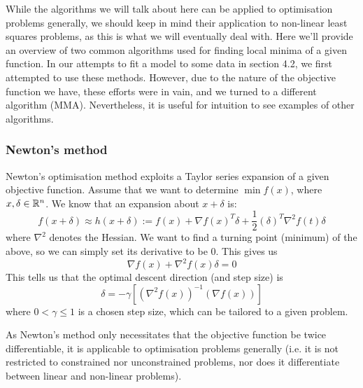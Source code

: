 While the algorithms we will talk about here can be applied to optimisation problems generally, we should 
keep in mind their application to non-linear least squares problems, as this is what we will eventually deal with. 
Here we'll provide an overview of two common algorithms 
used for finding local minima of a given function. In our attempts to fit a model to some data in section 4.2, we first 
attempted to use these methods. However, due to the nature of the objective function we have, these efforts were in vain, and 
we turned to a different algorithm (MMA). Nevertheless, it is useful for intuition to see examples of other algorithms.

\subsubsection{Newton's method}
Newton's optimisation method exploits a Taylor series expansion of a given objective function. Assume that we 
want to determine $\min f(x)$, where $x,\delta \in \mathbb{R}^n$. We know that an expansion about $x + \delta$ is:
\begin{equation*}
    f(x+\delta) \approx h(x+\delta) := f(x) + \nabla f(x)^{T} \delta + \frac{1}{2}(\delta)^{T} \nabla^2 f(t) \delta
\end{equation*}
where $\nabla^2$ denotes the Hessian. We want to find a turning point (minimum) of the above, so we can simply set its 
derivative to be $0$. This gives us
\begin{equation*}
    \nabla f(x) + \nabla^2 f(x) \delta = 0
\end{equation*}
This tells us that the optimal descent direction (and step size) is
\begin{equation*}
    \delta = - \gamma \left [  (\nabla^2 f(x))^{-1} (\nabla f(x)) \right ]
\end{equation*}
where $0 < \gamma \le 1$ is a chosen step size, which can be tailored to a given problem. 

\begin{remark}
    As Newton's method only necessitates that the objective function be twice differentiable, it is applicable to 
    optimisation problems generally (i.e. it is not restricted to constrained nor unconstrained problems, nor does it differentiate 
    between linear and non-linear problems).
\end{remark}

